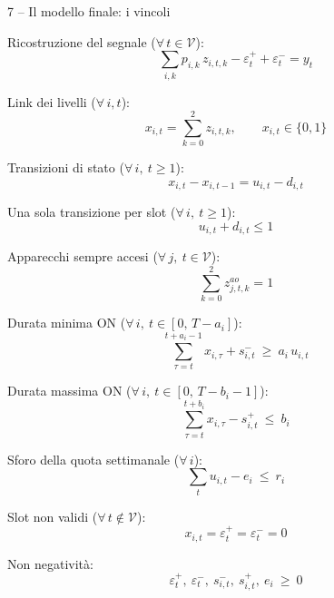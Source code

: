 \documentclass[aspectratio=169]{beamer}
\newcommand{\ep}{\varepsilon^{+}}
\newcommand{\en}{\varepsilon^{-}}
\begin{document}
\begin{frame}[allowframebreaks]{7 -- Il modello finale: i vincoli}
  \setlength{\jot}{0.9em}

  Ricostruzione del segnale ($\forall\, t \in \mathcal{V}$):
  \[
    \sum_{i,k} p_{i,k}\, z_{i,t,k} - \ep_t + \en_t = y_t
  \]

  Link dei livelli ($\forall\, i,t$):
  \[
    x_{i,t} = \sum_{k=0}^{2} z_{i,t,k}, \qquad x_{i,t}\in\{0,1\}
  \]

  Transizioni di stato ($\forall\, i,\ t\ge 1$):
  \[
    x_{i,t} - x_{i,t-1} = u_{i,t} - d_{i,t}
  \]

  Una sola transizione per slot ($\forall\, i,\ t\ge 1$):
  \[
    u_{i,t} + d_{i,t} \le 1
  \]

  Apparecchi sempre accesi ($\forall\, j,\ t \in \mathcal{V}$):
  \[
    \sum_{k=0}^{2} z^{ao}_{j,t,k} = 1
  \]

  Durata minima ON ($\forall\, i,\ t \in [0,\,T-a_i]$):
  \[
    \sum_{\tau=t}^{t+a_i-1} x_{i,\tau} + s^-_{i,t} \ \ge\ a_i\, u_{i,t}
  \]

  Durata massima ON ($\forall\, i,\ t \in [0,\,T-b_i-1]$):
  \[
    \sum_{\tau=t}^{t+b_i} x_{i,\tau} - s^+_{i,t} \ \le\ b_i
  \]

  Sforo della quota settimanale ($\forall\, i$):
  \[
    \sum_{t} u_{i,t} - e_i \ \le\ r_i
  \]

  Slot non validi ($\forall\, t \notin \mathcal{V}$):
  \[
    x_{i,t} = \ep_t = \en_t = 0
  \]

  Non negativit\`a:
  \[
    \ep_t,\ \en_t,\ s^-_{i,t},\ s^+_{i,t},\ e_i \ \ge\ 0
  \]
\end{frame}
\end{document}
